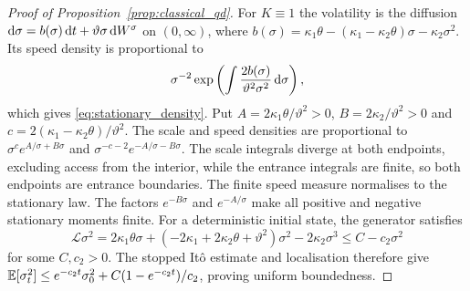 \begin{proof}[Proof of Proposition~\ref{prop:classical_qd}] For $K\equiv1$ the volatility is the diffusion $\mathrm{d}\sigma=b(\sigma)\,\mathrm{d} t+\vartheta\sigma\,\mathrm{d} W^\sigma$ on $(0,\infty)$, where $b(\sigma)=\kappa_1\theta-(\kappa_1-\kappa_2\theta)\sigma-\kappa_2\sigma^2$. Its speed density is proportional to
\begin{equation*}
\sigma^{-2}\exp\left(\int \frac{2b(\sigma)}{\vartheta^2\sigma^2}\,\mathrm{d}\sigma\right),
\end{equation*}
which gives \eqref{eq:stationary_density}. Put $A=2\kappa_1\theta/\vartheta^2>0$, $B=2\kappa_2/\vartheta^2>0$ and $c=2(\kappa_1-\kappa_2\theta)/\vartheta^2$. The scale and speed densities are proportional to $\sigma^c e^{A/\sigma+B\sigma}$ and $\sigma^{-c-2}e^{-A/\sigma-B\sigma}$. The scale integrals diverge at both endpoints, excluding access from the interior, while the entrance integrals are finite, so both endpoints are entrance boundaries. The finite speed measure normalises to the stationary law. The factors $e^{-B\sigma}$ and $e^{-A/\sigma}$ make all positive and negative stationary moments finite.
For a deterministic initial state, the generator satisfies
\begin{equation*}
\mathcal L\sigma^2=2\kappa_1\theta\sigma+
(-2\kappa_1+2\kappa_2\theta+\vartheta^2)\sigma^2-2\kappa_2\sigma^3
\le C-c_2\sigma^2
\end{equation*}
for some $C,c_2>0$. The stopped It\^o estimate and localisation therefore give
$\mathbb{E}[\sigma_t^2]\le e^{-c_2t}\sigma_0^2+C(1-e^{-c_2t})/c_2$, proving uniform boundedness.
\end{proof}

